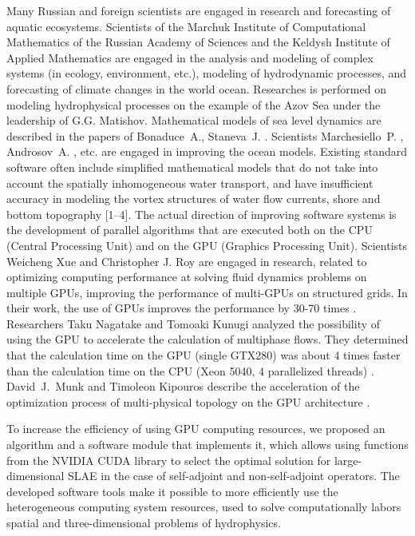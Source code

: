\documentclass{svproc}
\begin{document}
Many Russian and foreign scientists are engaged in research and forecasting of aquatic ecosystems.
Scientists of the Marchuk Institute of Computational Mathematics of the Russian Academy of Sciences and the Keldysh Institute of Applied Mathematics are engaged in the analysis and modeling of complex systems (in ecology, environment, etc.), modeling of hydrodynamic processes, and forecasting of climate changes in the world ocean.
Researches is performed on modeling hydrophysical processes on the example of the Azov Sea under the leadership of G.G. Matishov. Mathematical models of sea level dynamics are described in the papers of Bonaduce~A., Staneva~J. \cite{2020:Bonaduce}.
Scientists Marchesiello~P. \cite{2001:March:Will:Shch}, Androsov~A. \cite{2005:Andr:Wolz}, etc. are engaged in improving the ocean models.
Existing standard software often include simplified mathematical models that do not take into account the spatially inhomogeneous water transport, and have insufficient accuracy in modeling the vortex structures of water flow currents, shore and bottom topography [1--4].
The actual direction of improving software systems is the development of parallel algorithms that are executed both on the CPU (Central Processing Unit) and on the GPU (Graphics Processing Unit).
Scientists Weicheng Xue and Christopher J. Roy are engaged in research, related to optimizing computing performance at solving fluid dynamics problems on multiple GPUs, improving the performance of multi-GPUs on structured grids.
In their work, the use of GPUs improves the performance by 30-70 times \cite{2021:Xue:Roy,2018:Xue:Jackson}.
Researchers Taku Nagatake and Tomoaki Kunugi analyzed the possibility of using the GPU to accelerate the calculation of multiphase flows.
They determined that the calculation time on the GPU (single GTX280) was about 4 times faster than the calculation time on the CPU (Xeon 5040, 4 parallelized threads) \cite{2010:Nagatake}.
David~J.~Munk and Timoleon Kipouros describe the acceleration of the optimization process of multi-physical topology on the GPU architecture \cite{2019:Munk}.

To increase the efficiency of using GPU computing resources, we proposed an algorithm and a software module that implements it, which allows using functions from the NVIDIA CUDA library to select the optimal solution for large-dimensional SLAE in the case of self-adjoint and non-self-adjoint operators.
The developed software tools make it possible to more efficiently use the heterogeneous computing system resources, used to solve computationally labors spatial and three-dimensional problems of hydrophysics.
\end{document}

